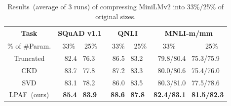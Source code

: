\begin{table}[h]
	\centering
	\scriptsize
	\begin{tabular}{c|ccc}
		\toprule
		Task & SQuAD v1.1   & QNLI     & MNLI-m/mm         \\
		\midrule
		 \% of \#Param. &33\%  ~~25\%            &~33\%  ~~25\%             &~33\%  ~~~~~~~~25\%          \\
		\midrule
	    Truncated       & 82.4 ~76.3          & 86.5~ 83.2          & 79.8/80.4~ 75.3/75.9         \\
	    CKD       & 83.7 ~77.8          & 87.2~ 83.3          & 80.0/80.6~ 75.4/76.0         \\

		\midrule
		SVD           & 83.1 ~78.2          & 86.0~ 83.5          & 80.3/81.0~ 77.5/78.6         \\
		LPAF~(ours)                  &\textbf{85.4} ~\textbf{83.9}          & \textbf{88.6}~ \textbf{87.8}          & \textbf{82.4/83.1}~ \textbf{81.5/82.3}           \\
		\bottomrule
	\end{tabular}
	\caption{Results~(average of 3 runs) of compressing MiniLMv2 into 33\%/25\% of original sizes.}
	\label{table:roberta}
\end{table}


